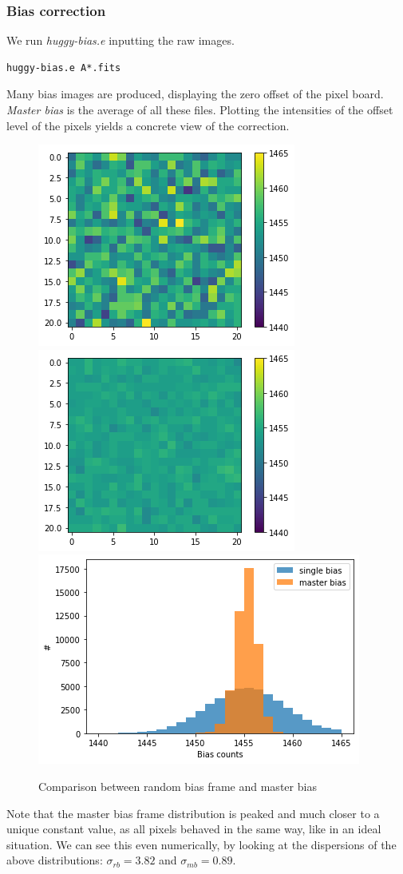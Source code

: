 \documentclass[a4paper,11pt,twocolumn]{article}
\begin{document}
\subsubsection{Bias correction}
We run \textit{huggy-bias.e} inputting the raw images. 
\begin{lstlisting}
huggy-bias.e A*.fits
\end{lstlisting}
Many bias images are produced,
displaying the zero offset of the pixel board. \textit{Master bias} is the average 
of all these files. Plotting the intensities of the offset level of the pixels yields 
a concrete view of the correction.
\begin{figure}
    \centering  
    \includegraphics[scale=0.5, angle=0]{../pictures/pre-reduction/bias.png}
    \includegraphics[scale=0.5, angle=0]{../pictures/pre-reduction/master_bias.png}
    \includegraphics[scale=0.5, angle=0]{../pictures/pre-reduction/bias_comp.png}
    \caption{Comparison between random bias frame and master bias}
\end{figure}
Note that the master bias frame distribution is peaked and much closer to a 
unique constant value, as all pixels behaved in the same way, like in an 
ideal situation. We can see this even numerically, by looking at the 
dispersions of the above distributions: $\sigma_{rb} = 3.82$ and 
$\sigma_{mb} = 0.89$.
\end{document}
